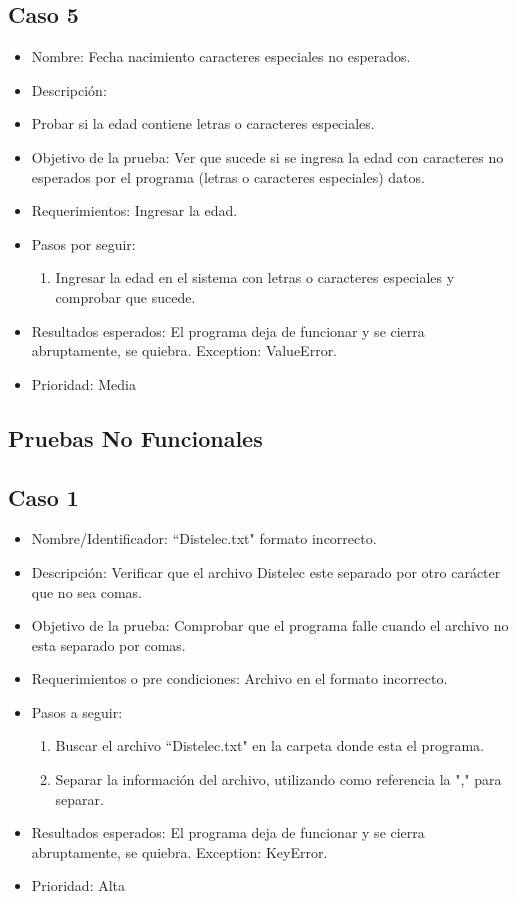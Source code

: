 \documentclass[conference]{IEEEtran}
\begin{document}
\subsection*{Caso 5}
\begin{itemize}
\item Nombre: Fecha nacimiento caracteres especiales no esperados.
\item Descripción: \item Probar si la edad contiene letras o caracteres especiales.
\item Objetivo de la prueba: Ver que sucede si se ingresa la edad con caracteres no esperados por el programa (letras o caracteres especiales) datos.
\item Requerimientos: Ingresar la edad. 
\item Pasos por seguir: 
\begin{enumerate}
\item Ingresar la edad en el sistema con letras o caracteres especiales y comprobar que sucede.
\end{enumerate}
\item Resultados esperados: El programa deja de funcionar y se cierra abruptamente, se quiebra. Exception: ValueError.
\item Prioridad: Media
\end{itemize}
\subsection{Pruebas No Funcionales}
\subsection*{Caso 1}
\begin{itemize}
\item Nombre/Identificador: ``Distelec.txt" formato incorrecto.
\item Descripción: Verificar que el archivo Distelec este separado por otro carácter que no sea comas.
\item Objetivo de la prueba: Comprobar que el programa falle cuando el archivo no esta separado por comas. 
\item Requerimientos o pre condiciones: Archivo en el formato incorrecto.
\item Pasos a seguir: 
\begin{enumerate}
\item Buscar el archivo ``Distelec.txt" en la carpeta donde esta el programa.
\item Separar la información del archivo, utilizando como referencia la "," para separar.
\end{enumerate}
\item Resultados esperados: El programa deja de funcionar y se cierra abruptamente, se quiebra. Exception: KeyError.
\item Prioridad: Alta
\end{itemize}
\end{document}
